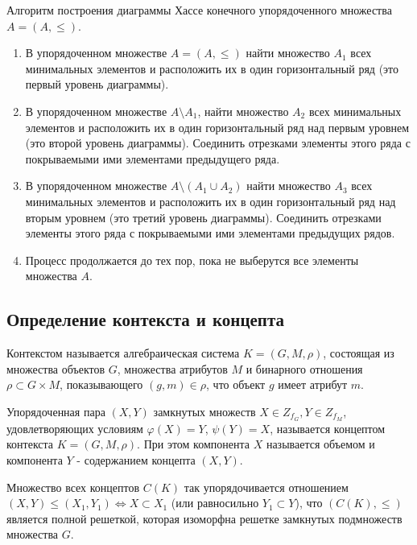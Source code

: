 \documentclass[bachelor, och, labwork]{shiza}
\begin{document}
        Алгоритм построения диаграммы Хассе конечного упорядоченного множества $A = (A, \leq)$.

        \begin{enumerate}
            \item В упорядоченном множестве $A = (A, \leq)$ найти множество $A_1$ всех минимальных элементов и расположить их в один горизонтальный ряд (это первый уровень диаграммы).
            \item В упорядоченном множестве $A \setminus A_1$, найти множество $A_2$ всех минимальных элементов и
            расположить их в один горизонтальный ряд над первым уровнем (это второй уровень диаграммы). Соединить
            отрезками элементы этого ряда с покрываемыми ими элементами предыдущего ряда.
            \item В упорядоченном множестве $A \setminus (A_1 \cup A_2)$ найти множество $A_3$ всех минимальных
            элементов и расположить их в один горизонтальный ряд над вторым уровнем (это третий уровень диаграммы).
            Соединить отрезками элементы этого ряда с покрываемыми ими элементами предыдущих рядов.
            \item Процесс продолжается до тех пор, пока не выберутся все элементы множества $A$.
        \end{enumerate}

    \subsection{Определение контекста и концепта}

        Контекстом называется алгебраическая система $K = (G, M, \rho)$, состоящая из множества объектов $G$, множества атрибутов $M$ и бинарного отношения $\rho \subset G \times M$, показывающего $(g, m) \in \rho$, что объект $g$ имеет атрибут $m$.

        Упорядоченная пара $(X, Y)$ замкнутых множеств $X \in Z_{f_G}, Y \in Z_{f_M}$, удовлетворяющих условиям $\varphi(X) = Y$, $\psi(Y) = X$, называется концептом контекста $K = (G, M, \rho)$. При этом компонента $X$ называется объемом и компонента $Y$ - содержанием концепта $(X, Y)$.

        Множество всех концептов $C(K)$ так упорядочивается отношением \\ $(X, Y) \leq (X_1, Y_1) \Leftrightarrow X \subset X_1$ (или равносильно $Y_1 \subset Y$), что $(C(K), \leq)$ является полной решеткой, которая изоморфна решетке замкнутых подмножеств множества $G$.
\end{document}
